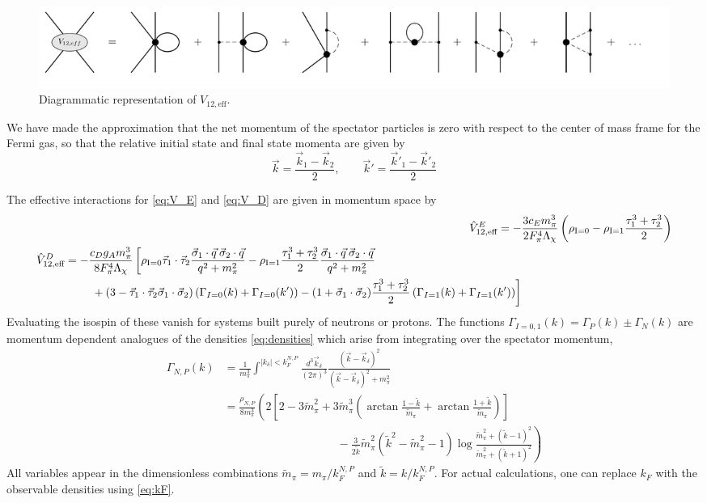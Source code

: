 \documentclass[%
 preprint,
 amsmath,amssymb,
 aps,
]{revtex4-1}
\newcommand{\veff}{\hat{V}_{12,\text{eff}}}
\newcommand{\rhozero}{\rho_{\text{I}=0}}
\newcommand{\rhoone}{\rho_{\text{I}=1}}
\newcommand{\taudot}{\vec{\tau}_1\cdot\vec{\tau}_2}
\newcommand{\tauplusthree}{\frac{\tau_1^3+\tau_2^3}{2}}
\newcommand{\sigmadot}{\vec{\sigma}_1\cdot\vec{\sigma}_2}
\begin{document}
\begin{figure}
\includegraphics[scale=0.6,page=1]{Figures/InMediumDiagrams2}
\caption{\label{fig:eff-diagram} Diagrammatic representation of $V_{12,\text{eff}}$.}
\end{figure}
 We have made the approximation that the net momentum of the spectator particles is zero with respect to the center of mass frame for the Fermi gas, so that the relative initial state and final state momenta are given by
 \begin{equation}
 \vec{k}=\frac{\vec{k}_1-\vec{k}_2}{2},\qquad \vec{k}'=\frac{\vec{k}'_1-\vec{k}'_2}{2}
 \end{equation}
 
 The effective interactions for \eqref{eq:V_E} and \eqref{eq:V_D} are given in momentum space by
 \begin{align}
 \veff^E=-&\frac{3c_Em_\pi^3}{2F_\pi^4 \Lambda_\chi}\left(\rhozero-\rhoone\tauplusthree\right)\\
 \begin{split}
 \veff^D=-&\frac{c_Dg_A m_\pi^3}{8 F_\pi^4\Lambda_\chi}\left[\rhozero\taudot \frac{\vec{\sigma}_1\cdot\vec{q}\:\vec{\sigma}_2\cdot\vec{q} }{q^2+m_\pi^2}  - \rhoone \tauplusthree\frac{\vec{\sigma}_1\cdot\vec{q}\:\vec{\sigma}_2\cdot\vec{q} }{q^2+m_\pi^2} \right. \\
&\left. \vphantom{\frac{1}{1}}+ (3-\taudot\sigmadot) \left(\Gamma_{I=0}(k)+\Gamma_{I=0}(k')\right)  -(1+\sigmadot)\tauplusthree \left(\Gamma_{I=1}(k) + \Gamma_{I=1}(k')\right) \right]
 \end{split} 
 \end{align}
Evaluating the isospin  of these vanish for systems built purely of neutrons or protons. The functions $\Gamma_{I=0,1}(k)=\Gamma_{P}(k)\pm\Gamma_{N}(k)$ are momentum dependent analogues of the densities \eqref{eq:densities} which arise from integrating over the spectator momentum,
 \begin{equation}
 \begin{split}
 \Gamma_{N,P}(k)&=\frac{1}{m_\pi^3}\int^{|k_\delta|<k_F^{N,P}}\frac{d^3\vec{k}_\delta}{(2\pi)^3} \frac{(\vec{k}-\vec{k}_\delta)^2}{(\vec{k}-\vec{k}_\delta)^2+m_\pi^2} \\
 &=\frac{\rho_{N,P}}{8m_\pi^3}\left(2\left[2-3\tilde{m}_\pi^2+3\tilde{m}_\pi^3\left(\arctan\frac{1-\tilde{k}}{\tilde{m}_\pi}+\arctan\frac{1+\tilde{k}}{\tilde{m}_\pi}\right)\right]\right. \\
 &\left.\qquad\qquad\qquad\qquad\qquad-\frac{3}{2 \tilde{k}}\tilde{m}_\pi^2\left(\tilde{k}^2-\tilde{m}_\pi^2-1\right)\log\frac{\tilde{m}_\pi^2+(\tilde{k}-1)^2}{\tilde{m}_\pi^2+(\tilde{k}+1)^2}\right)
 \end{split}
 \end{equation}
All variables appear in the dimensionless combinations $\tilde{m}_\pi=m_\pi/k_F^{N,P}$ and $\tilde{k}=k/k_F^{N,P}$. For actual calculations, one can replace $k_F$ with the observable densities using \eqref{eq:kF}.%
\end{document}
